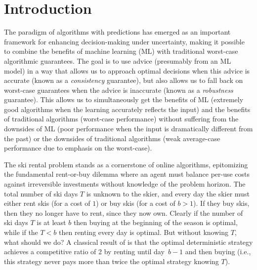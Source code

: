 \section{Introduction}
\label{sec:introduction}

The paradigm of algorithms with predictions has emerged as an important framework for enhancing decision-making under uncertainty, making it possible to combine the benefits of machine learning (ML) with traditional worst-case algorithmic guarantees. The goal is to use advice (presumably from an ML model) in a way that allows us to approach optimal decisions when this advice is accurate (known as a \emph{consistency} guarantee), but also allows us to fall back on worst-case guarantees when the advice is inaccurate (known as a \emph{robustness} guarantee).  This allows us to simultaneously get the benefits of ML (extremely good algorithms when the learning accurately reflects the input) and the benefits of traditional algorithms (worst-case performance) without suffering from the downsides of ML (poor performance when the input is dramatically different from the past) or the downsides of traditional algorithms (weak average-case performance due to emphasis on the worst-case).  

The ski rental problem stands as a cornerstone of online algorithms, epitomizing the fundamental rent-or-buy dilemma where an agent must balance per-use costs against irreversible investments without knowledge of the problem horizon. The total number of ski days $T$ is unknown to the skier, and every day the skier must either rent skis (for a cost of $1$) or buy skis (for a cost of $b > 1$).  If they buy skis, then they no longer have to rent, since they now own.  Clearly if the number of ski days $T$ is at least $b$ then buying at the beginning of the season is optimal, while if the $T < b$ then renting every day is optimal.  But without knowing $T$, what should we do?  A classical result of \citet{Karlin1986CompetitiveSC} is that the optimal deterministic strategy achieves a competitive ratio of 2 by renting until day~$b-1$ and then buying (i.e., this strategy never pays more than twice the optimal strategy knowing $T$).  

